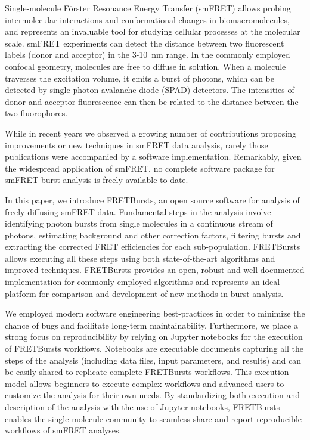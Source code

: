 Single-molecule Förster Resonance Energy Transfer (smFRET) allows
probing intermolecular interactions and conformational changes in
biomacromolecules, and represents an invaluable tool for studying
cellular processes at the molecular scale. smFRET experiments can
detect the distance between two fluorescent labels (donor and acceptor)
in the 3-10~nm range. In the commonly employed confocal geometry,
molecules are free to diffuse in solution. When a molecule traverses
the excitation volume, it emits a burst of photons, which can be detected
by single-photon avalanche diode (SPAD) detectors. The intensities of
donor and acceptor fluorescence can then be related to the distance
between the two fluorophores.

While in recent years we observed a growing number of contributions
proposing improvements or new techniques in smFRET data analysis,
rarely those publications were accompanied by a software implementation.
Remarkably, given the widespread application of smFRET, no complete
software package for smFRET burst analysis is freely available to date.

In this paper, we introduce FRETBursts, an open source software
for analysis of freely-diffusing smFRET data.
Fundamental steps in the analysis involve identifying photon bursts
from single molecules in a continuous stream of photons, estimating
background and other correction factors, filtering bursts and extracting
the corrected FRET efficiencies for each sub-population.
FRETBursts allows executing all these steps using both state-of-the-art
algorithms and improved techniques.
FRETBursts provides an open, robust and well-documented
implementation for commonly employed algorithms and represents
an ideal platform for comparison and development of new methods
in burst analysis.

We employed modern software engineering best-practices in order to
minimize the chance of bugs and facilitate long-term maintainability.
Furthermore, we place a strong focus on reproducibility by relying on
Jupyter notebooks for the execution of FRETBursts workflows.
Notebooks are executable documents capturing all the steps of the
analysis (including data files, input parameters, and results) and can
be easily shared to replicate complete FRETBursts workflows.
This execution model allows beginners to execute complex workflows
and advanced users to customize the analysis for their own needs.
By standardizing both execution and description of the analysis with
the use of Jupyter notebooks, FRETBursts enables the single-molecule
community to seamless share and report reproducible workflows of
smFRET analyses.
